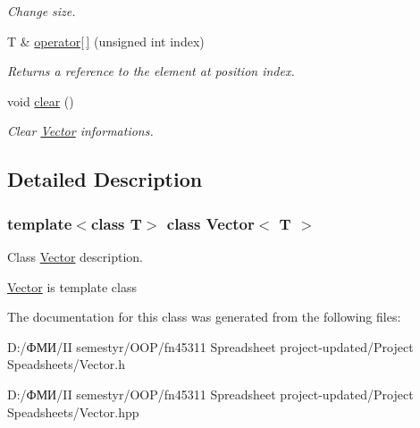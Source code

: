 \begin{DoxyCompactItemize}
\begin{DoxyCompactList}\small\item\em Change size. \end{DoxyCompactList}\item 
\mbox{\label{class_vector_a8fc2e5d2a6f8e1cabb451e97dbccadeb}} 
T \& \hyperlink{class_vector_a8fc2e5d2a6f8e1cabb451e97dbccadeb}{operator\mbox{[}$\,$\mbox{]}} (unsigned int index)
\begin{DoxyCompactList}\small\item\em Returns a reference to the element at position index. \end{DoxyCompactList}\item 
\mbox{\label{class_vector_a32ad98b135472b0ebc5d6cb3ae5d0085}} 
void \hyperlink{class_vector_a32ad98b135472b0ebc5d6cb3ae5d0085}{clear} ()
\begin{DoxyCompactList}\small\item\em Clear \hyperlink{class_vector}{Vector} informations. \end{DoxyCompactList}\end{DoxyCompactItemize}


\subsection{Detailed Description}
\subsubsection*{template$<$class T$>$\newline
class Vector$<$ T $>$}

Class \hyperlink{class_vector}{Vector} description. 

\hyperlink{class_vector}{Vector} is template class 

The documentation for this class was generated from the following files\+:\begin{DoxyCompactItemize}
\item 
D\+:/ФМИ/\+I\+I semestyr/\+O\+O\+P/fn45311 Spreadsheet project-\/updated/\+Project Speadsheets/Vector.\+h\item 
D\+:/ФМИ/\+I\+I semestyr/\+O\+O\+P/fn45311 Spreadsheet project-\/updated/\+Project Speadsheets/Vector.\+hpp\end{DoxyCompactItemize}
